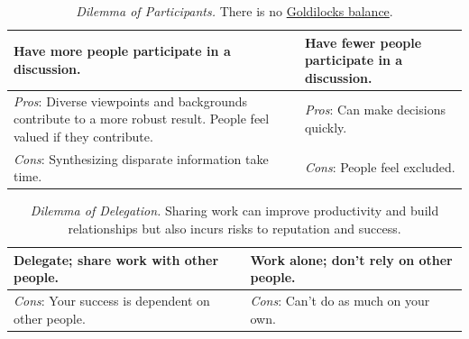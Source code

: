 \begin{center}
\begin{table}[H] %
\begin{tabular}{ | m{\dilemmatablewidth}| m{\dilemmatablewidth} | }
  \hline
  \textbf{Have more people participate in a discussion.} & 
  \textbf{Have fewer people participate in a discussion.} \\ 
  \hline
  \textit{Pros}: Diverse viewpoints and backgrounds contribute to a more robust result. People feel valued if they contribute. & 
  \textit{Pros}: Can make decisions quickly. \\  
  \hline
  \textit{Cons}: Synthesizing disparate information take time. & 
  \textit{Cons}: People feel excluded. \\  
  \hline
\end{tabular}
\caption{
\textit{Dilemma of Participants.}
There is no \href{https://en.wikipedia.org/wiki/Goldilocks_principle}{Goldilocks balance}.
}
\label{table:how-many-participants}
\end{table}
\end{center}
 



\begin{center}
\begin{table}[H] %
\begin{tabular}{ | m{\dilemmatablewidth}| m{\dilemmatablewidth} | } 
  \hline
  \textbf{Delegate; share work with other people.} & 
  \textbf{Work alone; don't rely on other people.} \\ 
  \hline
  \textit{Cons}: Your success is dependent on other people. & 
  \textit{Cons}: Can't do as much on your own. \\  
  \hline
\end{tabular}
\caption{
\textit{Dilemma of Delegation.}
Sharing work can improve productivity and build relationships but also incurs risks to reputation and success.
}
\label{table:delegate-or-not}
\end{table}
\end{center}

